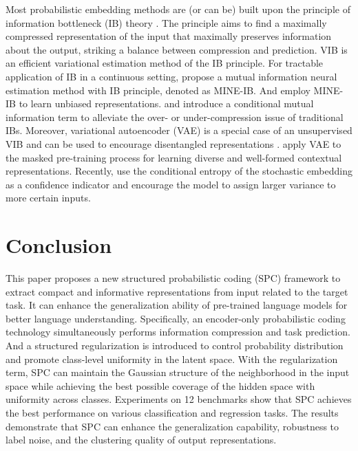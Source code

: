 \documentclass[letterpaper]{article} %
\begin{document}
Most probabilistic embedding methods \cite{DBLP:journals/corr/KingmaW13,DBLP:conf/iclr/AlemiFD017,DBLP:conf/iclr/HigginsMPBGBML17,DBLP:journals/entropy/Fischer20,DBLP:conf/cvpr/AnJC23} are (or can be) built upon the principle of information bottleneck (IB) theory \cite{tishby1999information,tishby2015deep}.
The principle aims to find a maximally compressed representation of the input that maximally preserves information about the output, striking a balance between compression and prediction.
VIB \cite{DBLP:conf/iclr/AlemiFD017} is an efficient variational estimation method of the IB principle.
For tractable application of IB in a continuous setting, \citet{DBLP:conf/icml/BelghaziBROBHC18} propose a mutual information neural estimation method with IB principle, denoted as MINE-IB.
And \citet{DBLP:conf/cvpr/RagonesiVCM21} employ MINE-IB to learn unbiased representations.
\citet{DBLP:journals/entropy/Fischer20} and \citet{DBLP:conf/iclr/RameC21} introduce a conditional mutual information term to alleviate the over- or under-compression issue of traditional IBs.
Moreover,
variational autoencoder (VAE) \cite{DBLP:journals/corr/KingmaW13} is a special case of an unsupervised VIB and can be used to encourage disentangled representations
\cite{DBLP:conf/iclr/HigginsMPBGBML17}.
\citet{DBLP:conf/emnlp/0001HDZJMS22}
apply VAE to the masked pre-training process for learning diverse and well-formed contextual representations.
Recently, \citet{DBLP:conf/cvpr/AnJC23} use the conditional entropy of the stochastic embedding as a confidence indicator and encourage the model to assign larger variance to more certain inputs.



\section{Conclusion}
This paper proposes a new structured probabilistic coding (SPC) framework to extract compact and informative representations from input related to the target task. It can enhance the generalization ability of pre-trained language models for better language understanding. Specifically, an encoder-only probabilistic coding technology simultaneously performs information compression and task prediction. And a structured regularization is introduced to control probability distribution and promote class-level uniformity in the latent space.
With the regularization term, SPC can maintain the Gaussian structure of the neighborhood in the input space while achieving the best possible coverage of the hidden space with uniformity across classes.
Experiments on 12 benchmarks show that SPC achieves the best performance on various classification and regression tasks. The results demonstrate that SPC can enhance the generalization capability, robustness to label noise, and the clustering quality of output representations.
\end{document}
